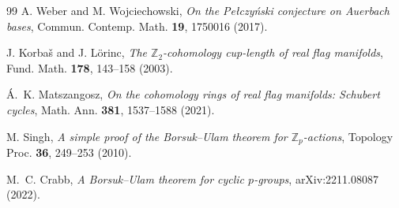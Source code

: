 \documentclass[11pt,a4paper]{article}
\begin{document}
\begin{thebibliography}{99}
A. Weber and M. Wojciechowski, \emph{On the Pe\l{}czy\'nski conjecture on
Auerbach bases}, Commun. Contemp. Math. \textbf{19}, 1750016 (2017).

J. Korba{\v s} and J. L\"orinc, \emph{The $\mathbb Z_2$-cohomology cup-length
of real flag manifolds}, Fund. Math. \textbf{178}, 143--158 (2003).

\'A.~K. Matszangosz, \emph{On the cohomology rings of real flag manifolds:
Schubert cycles}, Math. Ann. \textbf{381}, 1537--1588 (2021).

M. Singh, \emph{A simple proof of the Borsuk--Ulam theorem for
$\mathbb Z_p$-actions}, Topology Proc. \textbf{36}, 249--253 (2010).

M.~C. Crabb, \emph{A Borsuk--Ulam theorem for cyclic $p$-groups},
arXiv:2211.08087 (2022).

\end{thebibliography}
\end{document}

